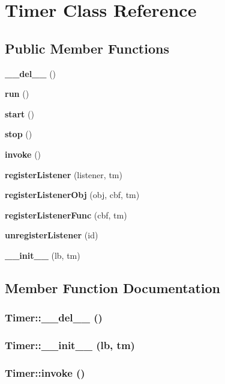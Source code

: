 \section{Timer Class Reference}
\label{classTimer}
\subsection*{Public Member Functions}
\begin{CompactItemize}
\item 
{\bf \_\-\_\-del\_\-\_\-} ()
\item 
{\bf run} ()
\item 
{\bf start} ()
\item 
{\bf stop} ()
\item 
{\bf invoke} ()
\item 
{\bf register\-Listener} (listener, tm)
\item 
{\bf register\-Listener\-Obj} (obj, cbf, tm)
\item 
{\bf register\-Listener\-Func} (cbf, tm)
\item 
{\bf unregister\-Listener} (id)
\item 
{\bf \_\-\_\-init\_\-\_\-} (lb, tm)
\end{CompactItemize}


\subsection{Member Function Documentation}
\subsubsection{\setlength{\rightskip}{0pt plus 5cm}Timer::\_\-\_\-del\_\-\_\- ()}\label{classTimer_Timera0}


\subsubsection{\setlength{\rightskip}{0pt plus 5cm}Timer::\_\-\_\-init\_\-\_\- (lb, tm)}\label{classTimer_Timera9}


\subsubsection{\setlength{\rightskip}{0pt plus 5cm}Timer::invoke ()}\label{classTimer_Timera4}


